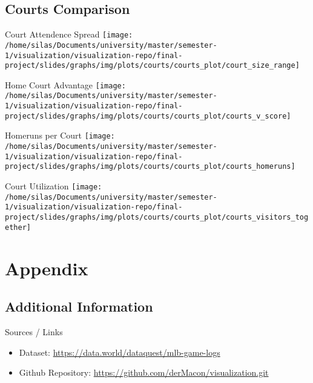 \documentclass[pdf]{beamer}
\begin{document}
    \subsection{Courts Comparison}
    \begin{frame}{Court Attendence Spread}
        \centering
        \texttt{[image: /home/silas/Documents/university/master/semester-1/visualization/visualization-repo/final-project/slides/graphs/img/plots/courts/courts\_plot/court\_size\_range]}
    \end{frame}
    \begin{frame}{Home Court Advantage}
        \centering
        \texttt{[image: /home/silas/Documents/university/master/semester-1/visualization/visualization-repo/final-project/slides/graphs/img/plots/courts/courts\_plot/courts\_v\_score]}
    \end{frame}
    \begin{frame}{Homeruns per Court}
        \centering
        \texttt{[image: /home/silas/Documents/university/master/semester-1/visualization/visualization-repo/final-project/slides/graphs/img/plots/courts/courts\_plot/courts\_homeruns]}
    \end{frame}
    \begin{frame}{Court Utilization}
        \centering
        \texttt{[image: /home/silas/Documents/university/master/semester-1/visualization/visualization-repo/final-project/slides/graphs/img/plots/courts/courts\_plot/courts\_visitors\_together]}
    \end{frame}


    \section{Appendix}

    \subsection{Additional Information}
    \begin{frame}{Sources / Links}
        \begin{itemize}
            \item Dataset: \href{https://data.world/dataquest/mlb-game-logs}{https://data.world/dataquest/mlb-game-logs}
            \item Github Repository: \href{https://github.com/derMacon/visualization.git}{https://github.com/derMacon/visualization.git}
        \end{itemize}
    \end{frame}
\end{document}
